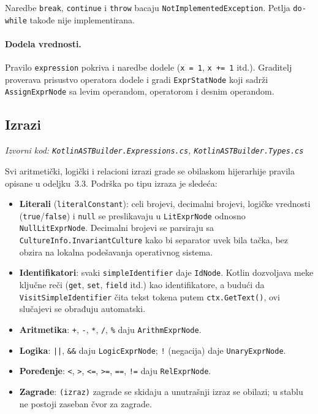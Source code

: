 \documentclass[a4paper]{article}
\begin{document}
\noindent
Naredbe \texttt{break}, \texttt{continue} i \texttt{throw} bacaju
\texttt{NotImplementedException}. Petlja \texttt{do-while} takođe nije
implementirana.

\paragraph{Dodela vrednosti.}
Pravilo \texttt{expression} pokriva i naredbe dodele (\texttt{x = 1},
\texttt{x += 1} itd.). Graditelj proverava prisustvo operatora dodele i
gradi \texttt{ExprStatNode} koji sadrži \texttt{AssignExprNode} sa levim
operandom, operatorom i desnim operandom.

\subsection{Izrazi}
\noindent\textit{Izvorni kod: \texttt{KotlinASTBuilder.Expressions.cs}, \texttt{KotlinASTBuilder.Types.cs}}
\medskip

Svi aritmetički, logički i relacioni izrazi grade se obilaskom hijerarhije
pravila opisane u odeljku~3.3. Podrška po tipu izraza je sledeća:

\begin{itemize}
    \item \textbf{Literali} (\texttt{literalConstant}): celi brojevi, decimalni
          brojevi, logičke vrednosti (\texttt{true}/\texttt{false}) i
          \texttt{null} se preslikavaju u \texttt{LitExprNode} odnosno
          \texttt{NullLitExprNode}. Decimalni brojevi se parsiraju sa
          \texttt{CultureInfo.InvariantCulture} kako bi separator uvek bila
          tačka, bez obzira na lokalna podešavanja operativnog sistema.
    \item \textbf{Identifikatori}: svaki \texttt{simpleIdentifier} daje
          \texttt{IdNode}. Kotlin dozvoljava meke ključne reči (\texttt{get},
          \texttt{set}, \texttt{field} itd.) kao identifikatore, a budući da
          \texttt{VisitSimpleIdentifier} čita tekst tokena putem
          \texttt{ctx.GetText()}, ovi slučajevi se obrađuju automatski.
    \item \textbf{Aritmetika}: \texttt{+}, \texttt{-}, \texttt{*}, \texttt{/},
          \texttt{\%} daju \texttt{ArithmExprNode}.
    \item \textbf{Logika}: \texttt{||}, \texttt{\&\&} daju \texttt{LogicExprNode};
          \texttt{!} (negacija) daje \texttt{UnaryExprNode}.
    \item \textbf{Poređenje}: \texttt{<}, \texttt{>}, \texttt{<=}, \texttt{>=},
          \texttt{==}, \texttt{!=} daju \texttt{RelExprNode}.
    \item \textbf{Zagrade}: \texttt{(izraz)}  zagrade se skidaju a unutrašnji
          izraz se obilazi; u stablu ne postoji zaseban čvor za zagrade.
\end{itemize}
\end{document}
